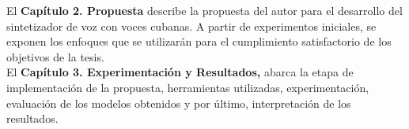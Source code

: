 El \textbf{Capítulo 2. Propuesta} describe la propuesta del autor para el desarrollo del sintetizador de voz con voces cubanas. A partir de experimentos iniciales, se exponen los enfoques que se utilizarán para el cumplimiento satisfactorio de los objetivos de la tesis.\\

 
El \textbf{Capítulo 3. Experimentación y Resultados,} abarca la etapa de implementación de la propuesta, herramientas utilizadas, experimentación, evaluación de los modelos obtenidos y por último, interpretación de los resultados.
